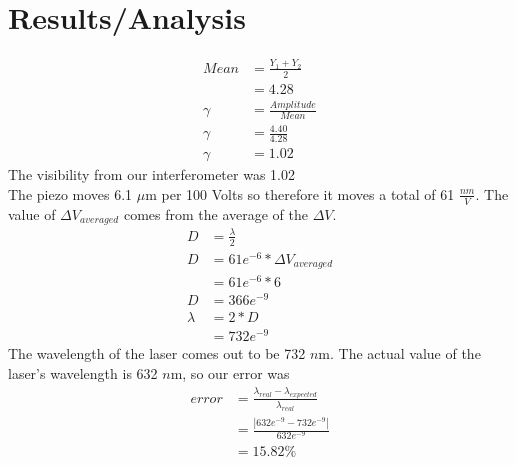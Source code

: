 \section{Results/Analysis}
\label{sec:results}
\begin{align*}
	Mean &= \frac{Y_1 + Y_2}{2} \\
		 &= 4.28 \\
    \gamma &= \frac{Amplitude}{Mean} \\
	\gamma &= \frac{4.40}{4.28} \\
	\gamma &= 1.02
\end{align*} 
The visibility from our interferometer was 1.02 \\
The piezo moves 6.1 $\mu$m per 100 Volts so therefore it moves a total of 61 $\frac{nm}{V}$.
The value of $\Delta V_{averaged}$ comes from the average of the $\Delta V$.
\begin{align*}
	D &= \frac{\lambda}{2} \\
	D &= 61e^{-6} * \Delta V_{averaged} \\
	  &= 61e^{-6} * 6 \\
	D &= 366e^{-9} \\
	\lambda &= 2*D \\
	 &= 732e^{-9}	
\end{align*}
The wavelength of the laser comes out to be 732 $n$m. The actual value of the laser's wavelength is 632 $n$m, so our error was 
	\begin{align*}
		error &=\frac{\lambda_{real}-\lambda_{expected}}{\lambda_{real}} \\
			&= \frac{|632e^{-9}-732e^{-9}|}{632e^{-9}}	\\	
			&= 15.82 \%
	\end{align*}
